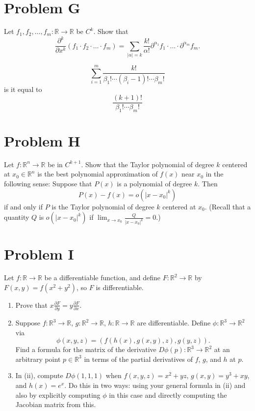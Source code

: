 \documentclass[lang=en,11pt]{template}
\begin{document}
\section*{Problem G}
Let $f_1, f_2, \ldots, f_m : \mathbb{R} \to \mathbb{R}$ be $C^k$. Show that
\[
\frac{\partial^k}{\partial x^k}(f_1 \cdot f_2 \cdot \ldots \cdot f_m) = \sum_{|\alpha| = k} \frac{k!}{\alpha!} \partial^{\alpha_1} f_1 \cdot \ldots \cdot \partial^{\alpha_m} f_m.
\]


$$
\sum_{i=1}^m \frac{k!}{\beta_1 ! \cdots (\beta_i- 1)! \cdots \beta_m !}
$$
is it equal to 
$$
 \frac{(k+1)!}{\beta_1 !  \cdots \beta_m !}
$$


\section*{Problem H}
Let $f : \mathbb{R}^n \to \mathbb{R}$ be in $C^{k+1}$. Show that the Taylor polynomial of degree $k$ centered at $x_0 \in \mathbb{R}^n$ is the best polynomial approximation of $f(x)$ near $x_0$ in the following sense: Suppose that $P(x)$ is a polynomial of degree $k$. Then
\[
P(x) - f(x) = o(|x - x_0|^k)
\]
if and only if $P$ is the Taylor polynomial of degree $k$ centered at $x_0$. (Recall that a quantity $Q$ is $o(|x - x_0|^k)$ if $\lim_{x \to x_0} \frac{Q}{|x - x_0|^k} = 0$.)


\section*{Problem I}
Let $f : \mathbb{R} \to \mathbb{R}$ be a differentiable function, and define $F : \mathbb{R}^2 \to \mathbb{R}$ by $F(x, y) = f(x^2 + y^2)$, so $F$ is differentiable.

\begin{enumerate}
    \item Prove that $x \frac{\partial F}{\partial y} = y \frac{\partial F}{\partial x}$.
    \item Suppose $f : \mathbb{R}^3 \to \mathbb{R}$, $g : \mathbb{R}^2 \to \mathbb{R}$, $h : \mathbb{R} \to \mathbb{R}$ are differentiable. Define $\phi : \mathbb{R}^3 \to \mathbb{R}^2$ via
    \[
    \phi(x, y, z) = (f(h(x), g(x, y), z), g(y, z)).
    \]
    Find a formula for the matrix of the derivative $D\phi(p) : \mathbb{R}^3 \to \mathbb{R}^2$ at an arbitrary point $p \in \mathbb{R}^3$ in terms of the partial derivatives of $f$, $g$, and $h$ at $p$.
    \item In (ii), compute $D\phi(1, 1, 1)$ when $f(x, y, z) = x^2 + yz$, $g(x, y) = y^3 + xy$, and $h(x) = e^x$. Do this in two ways: using your general formula in (ii) and also by explicitly computing $\phi$ in this case and directly computing the Jacobian matrix from this.
\end{enumerate}
\end{document}
